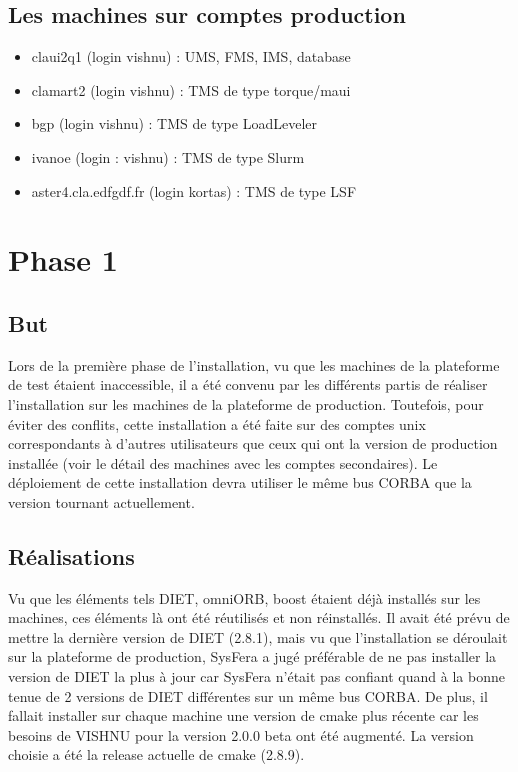 \documentclass{article}
\begin{document}
\subsection{Les machines sur comptes production}
\begin{itemize}
\item claui2q1 (login vishnu) : UMS, FMS, IMS, database
\item clamart2 (login vishnu) : TMS de type torque/maui
\item bgp (login vishnu) : TMS de type LoadLeveler
\item ivanoe (login : vishnu) : TMS de type  Slurm
\item aster4.cla.edfgdf.fr (login kortas) : TMS de type  LSF
\end{itemize}

\section{Phase 1}
\subsection{But}
Lors de la premi\`ere phase de l'installation, vu que les
machines de la plateforme de test \'etaient inaccessible,
il a \'et\'e convenu par les diff\'erents partis de 
r\'ealiser l'installation sur les machines de la
plateforme de production. Toutefois, pour \'eviter des
conflits, cette installation a \'et\'e faite sur des comptes
unix correspondants \`a d'autres utilisateurs que ceux 
qui ont la version de production install\'ee (voir le d\'etail
des machines avec les comptes secondaires). Le d\'eploiement
de cette installation devra utiliser le m\^eme bus CORBA 
que la version tournant actuellement. 

\subsection{R\'ealisations}
Vu que les \'el\'ements tels DIET, omniORB, boost \'etaient 
d\'ej\`a install\'es sur les machines, ces \'el\'ements l\`a
ont \'et\'e r\'eutilis\'es et non r\'einstall\'es. Il avait \'et\'e pr\'evu
de mettre la derni\`ere version de DIET (2.8.1), mais vu que l'installation
se d\'eroulait sur la plateforme de production,
SysFera a jug\'e pr\'ef\'erable de ne pas installer la
version de DIET la plus \`a jour car SysFera n'\'etait pas confiant
quand \`a la bonne tenue de 2 versions de DIET diff\'erentes sur un 
m\^eme bus CORBA. De plus, il fallait installer sur chaque machine
une version de cmake plus r\'ecente car les besoins de VISHNU pour 
la version 2.0.0 beta ont \'et\'e augment\'e. La version choisie a \'et\'e
la release actuelle de cmake (2.8.9).
\end{document}
